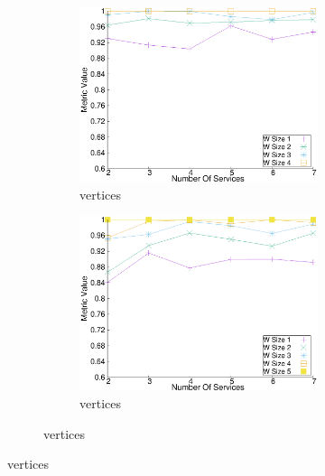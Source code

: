 \begin{figure}[H]
\begin{adjustbox}{minipage=\linewidth,scale=0.75}
\begin{subfigure}{0.45\textwidth}
    \begin{subfigure}{\textwidth}
      \includegraphics[width=\textwidth]{Images/graphs/window_quality_performance_diff_perce_n7_s7_50_89_n4}
      \caption{ vertices}
  
      \label{fig:quality_window_average_perce_n4}
    \end{subfigure}
    \begin{subfigure}{\textwidth}
      \includegraphics[width=\textwidth]{Images/graphs/window_quality_performance_diff_perce_n7_s7_50_89_n5}
      \caption{ vertices}
      \label{fig:quality_window_average_perce_n5}
    \end{subfigure}
  

\end{subfigure}
\end{adjustbox}
\end{figure}
